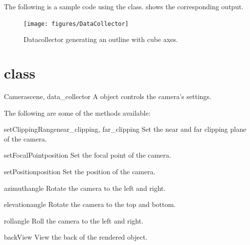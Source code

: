 The following is a sample code using the \DataCollector class. 
 shows the corresponding output. 


\begin{figure}[ht]
\begin{center}
\texttt{[image: figures/DataCollector]}
\end{center}
\caption{Datacollector generating an outline with cube axes.}
\label{fig:datacollector.1}
\end{figure}

\section{\Camera class}
\begin{classdesc}{Camera}{scene, data_collector}
A \Camera object controls the camera's settings.
\end{classdesc}

The following are some of the methods available:
\begin{methoddesc}[Camera]{setClippingRange}{near_clipping, far_clipping}
Set the near and far clipping plane of the camera.
\end{methoddesc}

\begin{methoddesc}[Camera]{setFocalPoint}{position}
Set the focal point of the camera.
\end{methoddesc}

\begin{methoddesc}[Camera]{setPosition}{position}
Set the position of the camera.
\end{methoddesc}

\begin{methoddesc}[Camera]{azimuth}{angle}
Rotate the camera to the left and right.
\end{methoddesc}

\begin{methoddesc}[Camera]{elevation}{angle}
Rotate the camera to the top and bottom.
\end{methoddesc}

\begin{methoddesc}[Camera]{roll}{angle}
Roll the camera to the left and right.
\end{methoddesc}

\begin{methoddesc}[Camera]{backView}{}
View the back of the rendered object.
\end{methoddesc}

